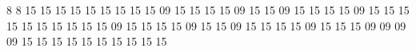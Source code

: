 8 8
15 15 15 15 15 15 15 15
15 09 15 15 15 15 09 15
15 09 15 15 15 15 09 15
15 15 15 15 15 15 15 15
15 09 15 15 15 15 09 15
15 09 15 15 15 15 09 15
15 15 09 09 09 09 15 15
15 15 15 15 15 15 15 15